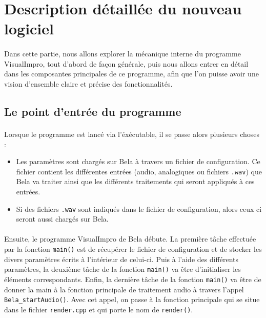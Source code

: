 \newpage

\section{Description détaillée du nouveau logiciel}
\paragraph{}
Dans cette partie, nous allons explorer la mécanique interne du programme VisualImpro, tout d'abord de façon générale, puis nous allons entrer en détail dans les composantes principales de ce programme, afin que l'on puisse avoir une vision d'ensemble claire et précise des fonctionnalités. 
\subsection{Le point d'entrée du programme}
\paragraph{}
Lorsque le programme est lancé via l'éxécutable, il se passe alors plusieurs choses :
\begin{itemize}
    \item Les paramètres sont chargés sur Bela à travers un fichier de configuration. Ce fichier contient les différentes entrées (audio, analogiques ou fichiers \verb!.wav!) que Bela va traiter ainsi que les différents traitements qui seront appliqués à ces entrées. 
    \item Si des fichiers \verb!.wav! sont indiqués dans le fichier de configuration, alors ceux ci seront aussi chargés sur Bela.
\end{itemize}
\paragraph{}
Ensuite, le programme VisualImpro de Bela débute. La première tâche effectuée par la fonction \verb!main()! est de récupérer le fichier de configuration et de stocker les divers paramètres écrits à l'intérieur de celui-ci. Puis à l'aide des différents paramètres, la deuxième tâche de la fonction \verb!main()!
va être d'initialiser les éléments correspondants. Enfin, la dernière tâche de la fonction \verb!main()! va être de donner la main à la fonction principale de traitement audio à travers l'appel \verb!Bela_startAudio()!. Avec cet appel, on passe à la fonction principale qui se situe dans le fichier \verb!render.cpp! et qui porte le nom de \verb!render()!.
